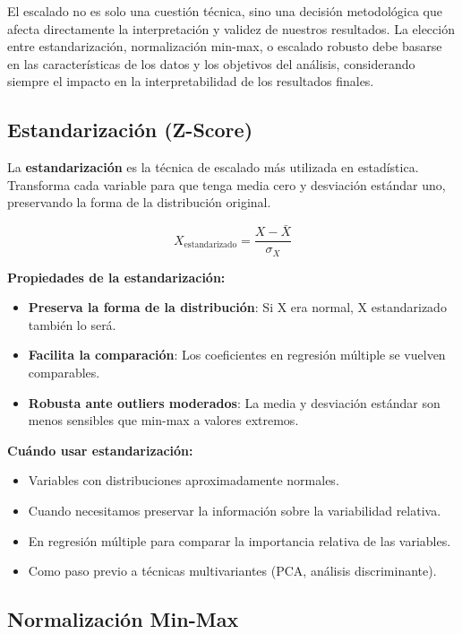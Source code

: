 \documentclass[
  letterpaper,
  DIV=11,
  numbers=noendperiod]{scrreprt}
\providecommand{\tightlist}{%
  \setlength{\itemsep}{0pt}\setlength{\parskip}{0pt}}
\begin{document}
El escalado no es solo una cuestión técnica, sino una decisión
metodológica que afecta directamente la interpretación y validez de
nuestros resultados. La elección entre estandarización, normalización
min-max, o escalado robusto debe basarse en las características de los
datos y los objetivos del análisis, considerando siempre el impacto en
la interpretabilidad de los resultados finales.

\subsection{Estandarización (Z-Score)}\label{estandarizaciuxf3n-z-score}

La \textbf{estandarización} es la técnica de escalado más utilizada en
estadística. Transforma cada variable para que tenga media cero y
desviación estándar uno, preservando la forma de la distribución
original.

\[X_{\text{estandarizado}} = \frac{X - \bar{X}}{\sigma_X}\]

\textbf{Propiedades de la estandarización:}

\begin{itemize}
\tightlist
\item
  \textbf{Preserva la forma de la distribución}: Si X era normal, X
  estandarizado también lo será.
\item
  \textbf{Facilita la comparación}: Los coeficientes en regresión
  múltiple se vuelven comparables.
\item
  \textbf{Robusta ante outliers moderados}: La media y desviación
  estándar son menos sensibles que min-max a valores extremos.
\end{itemize}

\textbf{Cuándo usar estandarización:}

\begin{itemize}
\tightlist
\item
  Variables con distribuciones aproximadamente normales.
\item
  Cuando necesitamos preservar la información sobre la variabilidad
  relativa.
\item
  En regresión múltiple para comparar la importancia relativa de las
  variables.
\item
  Como paso previo a técnicas multivariantes (PCA, análisis
  discriminante).
\end{itemize}

\subsection{Normalización Min-Max}\label{normalizaciuxf3n-min-max}
\end{document}
